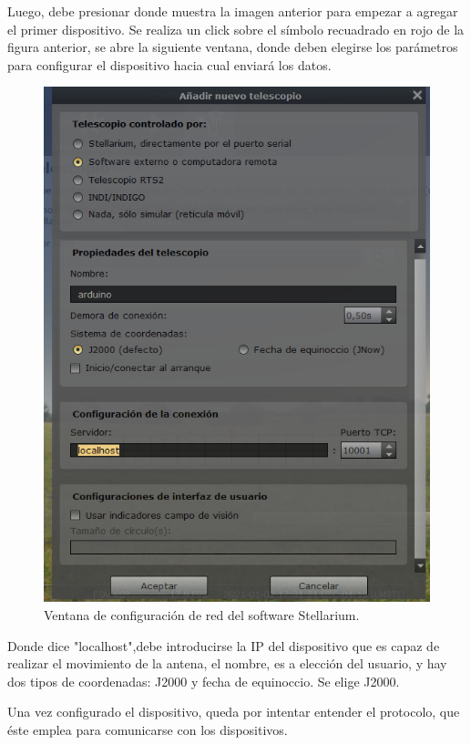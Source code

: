 Luego, debe presionar donde muestra la imagen anterior para empezar a agregar el primer dispositivo. Se realiza un click sobre el símbolo recuadrado en rojo de la figura anterior, se abre la siguiente ventana, donde deben elegirse los parámetros para configurar el dispositivo hacia cual enviará los datos.
\begin{figure}
	\centering
	\includegraphics[scale=0.5]{stellarium-024}
	\caption{Ventana de configuración de red del software Stellarium.}
\end{figure} 
Donde dice "localhost",debe introducirse la IP del dispositivo que es capaz de realizar el movimiento de la antena, el nombre, es a elección del usuario, y hay dos tipos de coordenadas: J2000 y fecha de equinoccio. Se elige J2000.

Una vez configurado el dispositivo, queda por intentar entender el protocolo, que éste emplea para comunicarse con los dispositivos. 

